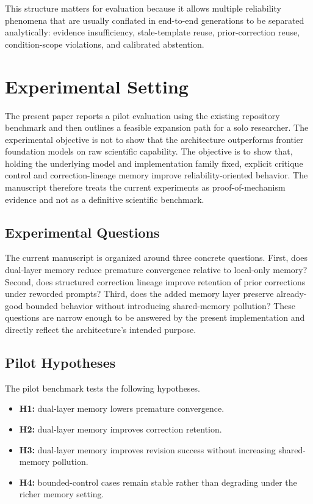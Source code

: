 \documentclass[12pt]{article}
\begin{document}
This structure matters for evaluation because it allows multiple reliability phenomena that are usually conflated in end-to-end generations to be separated analytically: evidence insufficiency, stale-template reuse, prior-correction reuse, condition-scope violations, and calibrated abstention.

\section{Experimental Setting}

The present paper reports a pilot evaluation using the existing repository benchmark and then outlines a feasible expansion path for a solo researcher. The experimental objective is not to show that the architecture outperforms frontier foundation models on raw scientific capability. The objective is to show that, holding the underlying model and implementation family fixed, explicit critique control and correction-lineage memory improve reliability-oriented behavior. The manuscript therefore treats the current experiments as proof-of-mechanism evidence and not as a definitive scientific benchmark.

\subsection{Experimental Questions}

The current manuscript is organized around three concrete questions. First, does dual-layer memory reduce premature convergence relative to local-only memory? Second, does structured correction lineage improve retention of prior corrections under reworded prompts? Third, does the added memory layer preserve already-good bounded behavior without introducing shared-memory pollution? These questions are narrow enough to be answered by the present implementation and directly reflect the architecture's intended purpose.

\subsection{Pilot Hypotheses}

The pilot benchmark tests the following hypotheses.

\begin{itemize}[leftmargin=1.2em]
\item \textbf{H1:} dual-layer memory lowers premature convergence.
\item \textbf{H2:} dual-layer memory improves correction retention.
\item \textbf{H3:} dual-layer memory improves revision success without increasing shared-memory pollution.
\item \textbf{H4:} bounded-control cases remain stable rather than degrading under the richer memory setting.
\end{itemize}
\end{document}
